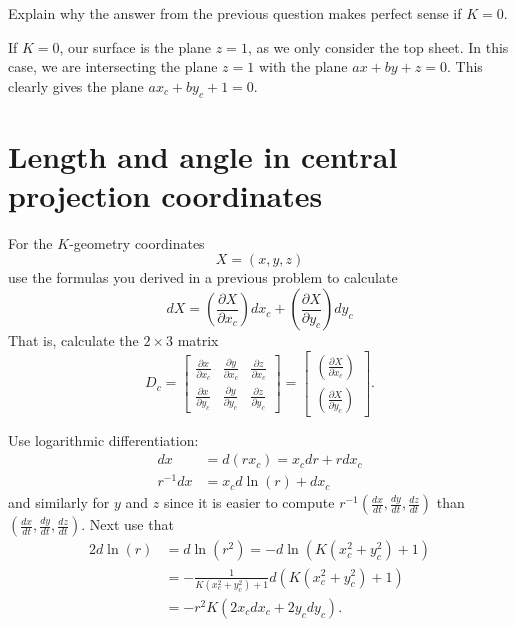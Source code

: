 \documentclass{ximera}
\begin{document}
\begin{problem}
  Explain why the answer from the previous question makes perfect sense if $K=0$.
  \begin{freeResponse}
    If $K=0$, our surface is the plane $z=1$, as we only consider the
    top sheet. In this case, we are intersecting the plane $z=1$ with
    the plane $ax+by+z=0$. This clearly gives the plane $ax_c+ by_c +
    1 = 0.$
  \end{freeResponse}
\end{problem}



\section{Length and angle in central projection coordinates}

\begin{problem}
\label{33}For the $K$-geometry coordinates%
\[
X=\left(  x,y,z\right)
\]
use the formulas you derived in a previous problem to calculate%
\[
dX=\left(  \frac{\partial X}{\partial x_{c}}\right)  dx_{c}+\left(
\frac{\partial X}{\partial y_{c}}\right)  dy_{c}%
\]
That is, calculate the $2\times3$ matrix%
\[
D_{c}=\begin{bmatrix}
\frac{\partial x}{\partial x_{c}} & \frac{\partial y}{\partial x_{c}} &
\frac{\partial z}{\partial x_{c}}\\
\frac{\partial x}{\partial y_{c}} & \frac{\partial y}{\partial y_{c}} &
\frac{\partial z}{\partial y_{c}}%
\end{bmatrix} =\begin{bmatrix}
\left(  \frac{\partial X}{\partial x_{c}}\right) \\
\left(  \frac{\partial X}{\partial y_{c}}\right)
\end{bmatrix} .
\]
\begin{hint}
Use logarithmic differentiation:%
\begin{align*}
dx  &  =d\left(  rx_{c}\right)  =x_{c}dr+rdx_{c}\\
r^{-1}dx  &  =x_{c}d\ln\left(  r\right)  +dx_{c}%
\end{align*}
and similarly for $y$ and $z$ since it is easier to compute $r^{-1}\left(
\frac{dx}{dt},\frac{dy}{dt},\frac{dz}{dt}\right)  $ than $\left(  \frac
{dx}{dt},\frac{dy}{dt},\frac{dz}{dt}\right)  $. Next use that%
\begin{align*}
2d\ln\left(  r\right)   &  =d\ln\left(  r^{2}\right)
=-d\ln\left(  K\left(  x_{c}^{2}+y_{c}^{2}\right)  +1\right) \\
&  =-\frac{1}{K\left(  x_{c}^{2}+y_{c}^{2}\right)  +1}d\left(  K\left(
x_{c}^{2}+y_{c}^{2}\right)  +1\right) \\
&  =-r^{2}K\left(  2x_{c}dx_{c}+2y_{c}dy_{c}\right)  .
\end{align*}
\end{hint}
\end{problem}
\end{document}
